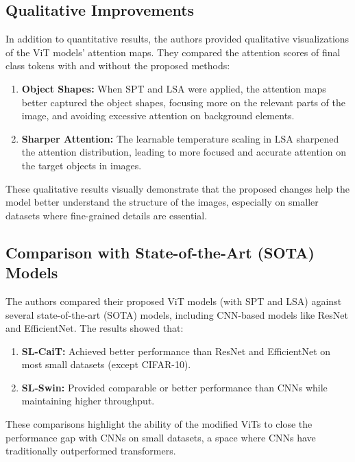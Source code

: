 \documentclass{report}
\begin{document}
	
	
	\subsection{Qualitative Improvements}
	In addition to quantitative results, the authors provided qualitative visualizations of the ViT models’ attention maps. They compared the attention scores of final class tokens with and without the proposed methods:
	
	\begin{enumerate}
		\item 
		\textbf{Object Shapes:} When SPT and LSA were applied, the attention maps better captured the object shapes, focusing more on the relevant parts of the image, and avoiding excessive attention on background elements.
		
		\item 
		\textbf{Sharper Attention:} The learnable temperature scaling in LSA sharpened the attention distribution, leading to more focused and accurate attention on the target objects in images.
	\end{enumerate}
	These qualitative results visually demonstrate that the proposed changes help the model better understand the structure of the images, especially on smaller datasets where fine-grained details are essential.
	
	
	
	\subsection{Comparison with State-of-the-Art (SOTA) Models}
	The authors compared their proposed ViT models (with SPT and LSA) against several state-of-the-art (SOTA) models, including CNN-based models like ResNet and EfficientNet. The results showed that:
	
	\begin{enumerate}
		\item 
		\textbf{SL-CaiT:} Achieved better performance than ResNet and EfficientNet on most small datasets (except CIFAR-10).
		
		\item 
		\textbf{SL-Swin:} Provided comparable or better performance than CNNs while maintaining higher throughput.
	\end{enumerate}
	These comparisons highlight the ability of the modified ViTs to close the performance gap with CNNs on small datasets, a space where CNNs have traditionally outperformed transformers.
	
\end{document}

